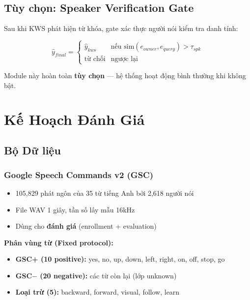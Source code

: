 \documentclass[12pt,a4paper]{report}
\begin{document}
\section{Tùy chọn: Speaker Verification Gate}

Sau khi KWS phát hiện từ khóa, gate xác thực người nói kiểm tra danh tính:

\begin{equation}
    \hat{y}_{final} = \begin{cases}
        \hat{y}_{kws} & \text{nếu } \text{sim}(e_{owner}, e_{query}) > \tau_{spk} \\
        \text{từ chối} & \text{ngược lại}
    \end{cases}
\end{equation}

Module này hoàn toàn \textbf{tùy chọn} --- hệ thống hoạt động bình thường
khi không bật.


\chapter{Kế Hoạch Đánh Giá}

\section{Bộ Dữ liệu}

\subsection{Google Speech Commands v2 (GSC)}

\begin{itemize}
    \item 105,829 phát ngôn của 35 từ tiếng Anh bởi 2,618 người nói
    \item File WAV 1 giây, tần số lấy mẫu 16kHz
    \item Dùng cho \textbf{đánh giá} (enrollment + evaluation)
\end{itemize}

\textbf{Phân vùng từ (Fixed protocol):}
\begin{itemize}
    \item \textbf{GSC+ (10 positive):} yes, no, up, down, left, right, on,
          off, stop, go
    \item \textbf{GSC$-$ (20 negative):} các từ còn lại (lớp unknown)
    \item \textbf{Loại trừ (5):} backward, forward, visual, follow, learn
\end{itemize}
\end{document}
